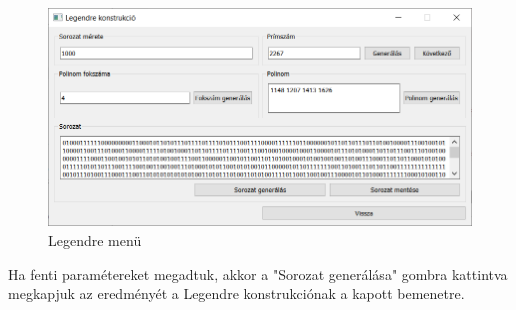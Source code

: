 \documentclass[12pt]{article}
\begin{document}
	\begin{figure}[h]
		\centering
		\begin{minipage}{\textwidth} %
			\includegraphics[width=\textwidth]{legendremenu.png}
		\end{minipage}
		\caption{Legendre menü}
	\end{figure}
	Ha fenti paramétereket megadtuk, akkor a "Sorozat generálása" gombra kattintva megkapjuk az eredményét a Legendre konstrukciónak a kapott bemenetre.
\end{document}
